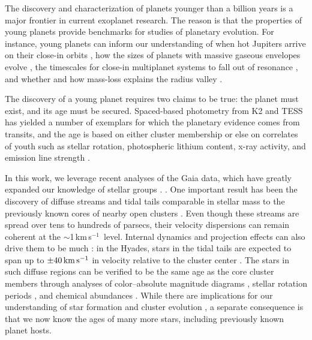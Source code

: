 \documentclass[12pt,twocolumn,tighten,linenumbers]{aastex63}
\newcommand{\kms}{\,km\,s$^{-1}$}
\newcommand{\mkms}{{\rm \,km\,s^{-1}}}  %
\begin{document}
The discovery and characterization of planets younger than a billion
years is a major frontier in current exoplanet research.  The reason
is that the properties of young planets provide benchmarks for studies
of planetary evolution.  For instance, young planets can inform our
understanding of when hot Jupiters arrive on their close-in orbits
\citep{dawson_johnson_2018}, how the sizes of planets with massive
gaseous envelopes evolve \citep{rizzuto_tess_2020}, the timescales for
close-in multiplanet systems to fall out of resonance
\citep{izidoro_breaking_2017,arevalo_stability_2022,goldberg_architectures_2022}, and
whether and how mass-loss explains the radius valley
\citep{lopez_how_2012,Owen_Wu_2013,Fulton_et_al_2017,ginzburg_corepowered_2018,lee_primordial_2021}.

The discovery of a young planet requires two claims to be true: the
planet must exist, and its age must be secured.  Spaced-based
photometry from K2 and TESS has yielded a number of exemplars for
which the planetary evidence comes from transits, and the age is based
on either cluster membership
\citep{Mann_et_al_2017,david_four_2019,newton_tess_2019,bouma_cluster_2020,nardiello_pathosII_2020}
or else on correlates of youth such as stellar rotation, photospheric
lithium content, x-ray activity, and emission line strength
\citep{zhou_2021_tois,hedges_toi-2076_2021}.

In this work, we leverage recent analyses of the Gaia data, which have
greatly expanded our knowledge of stellar groups
\citep[{e.g.},][]{CantatGaudin2018a,KounkelCovey2019,Kerr2021}.
.
One important result has been the discovery of diffuse
streams and tidal tails comparable in stellar mass to the previously
known cores of nearby open clusters
\citep{meingast_psceri_2019,Meingast2021,gagne_number_2021}.  Even
though these streams are spread over tens to hundreds of parsecs,
their velocity dispersions can remain coherent at the $\sim$1\kms\
level.  Internal dynamics and projection effects can also drive them
to be much \replaced{larger}{more kinematically diffuse}: in the Hyades, stars in the tidal tails are
expected to span up to $\pm 40\mkms$ in velocity relative to the
cluster center \citep{jerabkova_800_2021}.  The stars in such diffuse
regions can be verified to be the same age as the core cluster members
through analyses of color--absolute magnitude diagrams
\citep{KounkelCovey2019}, stellar rotation periods
\citep{curtis_tess_2019,bouma_2021_ngc2516}, and chemical abundances
\citep{hawkins_2020,2020A&A...635L..13A}.  While there are implications for our
understanding of star formation and cluster evolution
\citep{dinnbier_tidal_2020}, a separate consequence is that we now
know the ages of many more stars, including previously known planet
hosts.
\end{document}
